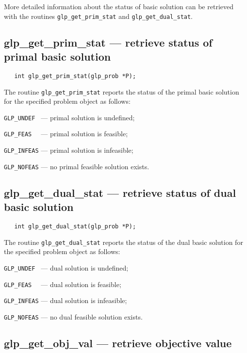 More detailed information about the status of basic solution can be
retrieved with the routines \verb|glp_get_prim_stat| and
\verb|glp_get_dual_stat|.

\subsection{glp\_get\_prim\_stat --- retrieve status of primal basic
solution}

\synopsis

\begin{verbatim}
   int glp_get_prim_stat(glp_prob *P);
\end{verbatim}

\returns

The routine \verb|glp_get_prim_stat| reports the status of the primal
basic solution for the specified problem object as follows:

\verb|GLP_UNDEF | --- primal solution is undefined;

\verb|GLP_FEAS  | --- primal solution is feasible;

\verb|GLP_INFEAS| --- primal solution is infeasible;

\verb|GLP_NOFEAS| --- no primal feasible solution exists.

\subsection{glp\_get\_dual\_stat --- retrieve status of dual basic
solution}

\synopsis

\begin{verbatim}
   int glp_get_dual_stat(glp_prob *P);
\end{verbatim}

\returns

The routine \verb|glp_get_dual_stat| reports the status of the dual
basic solution for the specified problem object as follows:

\verb|GLP_UNDEF | --- dual solution is undefined;

\verb|GLP_FEAS  | --- dual solution is feasible;

\verb|GLP_INFEAS| --- dual solution is infeasible;

\verb|GLP_NOFEAS| --- no dual feasible solution exists.

\subsection{glp\_get\_obj\_val --- retrieve objective value}

